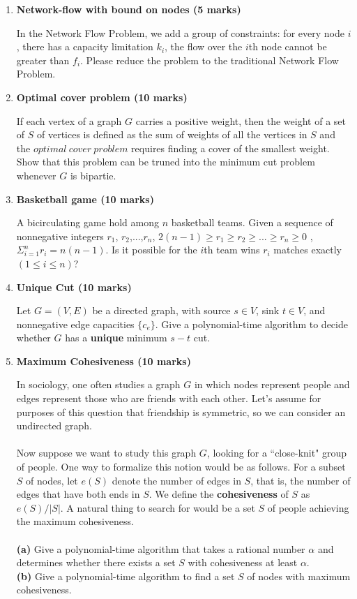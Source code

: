 \documentclass[a4paper,11pt]{article}
\begin{document}
\begin{enumerate}
 \item \textbf{Network-flow with bound on nodes (5 marks)}

In the Network Flow Problem, we add a group of constraints: for every node $i$, there has a capacity limitation $k_i$, the flow over the $i$th node cannot be greater than $f_i$. Please reduce the problem to the traditional Network Flow Problem.

\item \textbf{ Optimal cover problem (10 marks)}

If each vertex of a graph $G$ carries a positive weight, then the weight of a set of $S$ of vertices is defined as the sum of weights of all the vertices in $S$ and the $optimal\ cover\ problem$ requires finding a cover of the smallest weight. Show that this problem can be truned into the minimum cut problem whenever $G$ is bipartie.

\item \textbf{ Basketball game (10 marks)}

A bicirculating game hold among $n$ basketball teams. Given a sequence of nonnegative integers $r_1$, $r_2$,...,$r_n$, $2(n-1)\geq r_1\geq r_2\geq ...\geq r_n\geq 0$ , $\Sigma^n_{i=1}r_i=n(n-1)$. Is it possible for the $i$th team wins $r_i$ matches exactly $(1\leq i \leq n)$?

\item \textbf{Unique Cut (10 marks)}

Let $G=(V,E)$ be a directed graph, with source $s\in V$, sink $t\in V$, and nonnegative edge capacities $\{ c_e \}$. Give a polynomial-time algorithm to decide whether $G$ has a {\bf unique} minimum $s-t$ cut.

\item \textbf{Maximum Cohesiveness (10 marks)}

In sociology, one often studies a graph $G$ in which nodes represent people and edges represent those who are friends with each other. Let's assume for purposes of this question that friendship is symmetric, so we can consider an undirected graph.\\\\
	   Now suppose we want to study this graph $G$, looking for a ``close-knit" group of people. One way to formalize this notion would be as follows. For a subset $S$ of nodes, let $e(S)$ denote the number of edges in $S$, that is, the number of edges that have both ends in $S$. We define the {\bf cohesiveness} of $S$ as $e(S)/|S|$. A natural thing to search for would be a set $S$ of people achieving the maximum cohesiveness.\\\\
{\bf (a)} Give a polynomial-time algorithm that takes a rational number $\alpha$ and determines whether there exists a set $S$ with cohesiveness at least $\alpha$.\\
{\bf (b)} Give a polynomial-time algorithm to find a set $S$ of nodes with maximum cohesiveness.

\end{enumerate}
\end{document}
